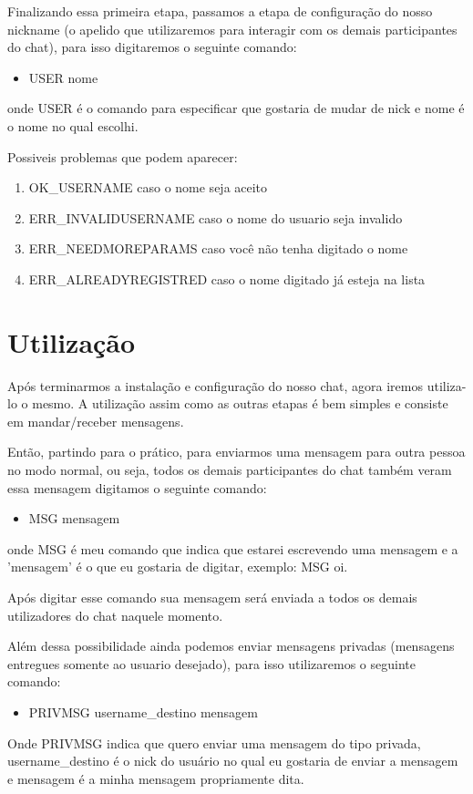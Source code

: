 \documentclass{abnt}
\begin{document}
	Finalizando essa primeira etapa, passamos a etapa de configuração do nosso nickname (o apelido que utilizaremos para interagir com os demais participantes do chat), para isso digitaremos o seguinte comando:
	\begin{itemize}
		\item USER nome	
	\end{itemize}
	onde USER é o comando para especificar que gostaria de mudar de nick e nome é o nome no qual escolhi.

	Possiveis problemas que podem aparecer:
	\begin{enumerate}
		
		\item  OK\_USERNAME caso o nome seja aceito
		\item  ERR\_INVALIDUSERNAME caso o nome do usuario seja invalido
		\item  ERR\_NEEDMOREPARAMS caso você não tenha digitado o nome
		\item  ERR\_ALREADYREGISTRED caso o nome digitado já esteja na lista	
	\end{enumerate}
	
	\section{Utilização}		
	Após terminarmos a instalação e configuração do nosso chat, agora iremos utiliza-lo o mesmo. A utilização assim como as outras etapas é bem simples e consiste em mandar/receber mensagens.
	
	Então, partindo para o prático, para enviarmos uma mensagem para outra pessoa no modo normal, ou seja, todos os demais participantes do chat também veram essa mensagem digitamos o seguinte comando:
	\begin{itemize}
		\item MSG mensagem 	
	\end{itemize}
	onde MSG é meu comando que indica que estarei escrevendo uma mensagem e a 'mensagem' é o que eu gostaria de digitar, exemplo: MSG oi.
	
	Após digitar esse comando sua mensagem será enviada a todos os demais utilizadores do chat naquele momento.
	
	Além dessa possibilidade ainda podemos enviar mensagens privadas (mensagens entregues somente ao usuario desejado), para isso utilizaremos o seguinte comando:
	\begin{itemize}
		\item PRIVMSG username\_destino mensagem
	\end{itemize}
	Onde PRIVMSG indica que quero enviar uma mensagem do tipo privada, username\_destino é o nick do usuário no qual eu gostaria de enviar a mensagem e mensagem é a minha mensagem propriamente dita.
	
\end{document}

